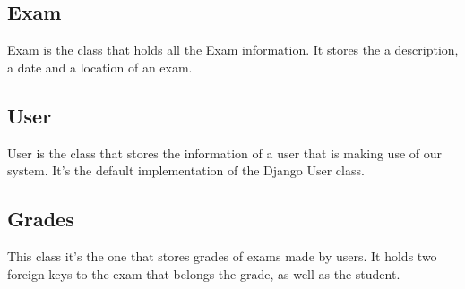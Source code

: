 \documentclass[11pt]{article}
\begin{document}
\subsection{Exam}
\label{sec:orgbcc73c2}
Exam is the class that holds all the Exam information. It stores the
a description, a date and a location of an exam.

\subsection{User}
\label{sec:orga01a2e5}
User is the class that stores the information of a user that is making
use of our system. It's the default implementation of the Django User
class.

\subsection{Grades}
\label{sec:org1e51923}
This class it's the one that stores grades of exams made by users. It holds two
foreign keys to the exam that belongs the grade, as well as the student.
\newpage
\end{document}
